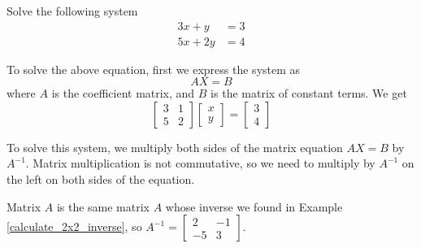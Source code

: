 \begin{example}
    Solve the following system
    \[
        \begin{aligned}
            3x + y  & = 3 \\
            5x + 2y & = 4
        \end{aligned}
    \]
\end{example}

\begin{solution}
    To solve the above equation, first we express the system as
    \[ AX = B \]
    where \( A \) is the coefficient matrix, and \( B \) is the matrix of constant terms. We get
    \[
        \left[
            \begin{array}{cc}
                3 & 1 \\
                5 & 2
            \end{array}
            \right]
        \left[
            \begin{array}{c}
                x \\
                y
            \end{array}
            \right]
        =
        \left[
            \begin{array}{c}
                3 \\
                4
            \end{array}
            \right]
    \]

    To solve this system, we multiply both sides of the matrix equation \( AX = B \) by \( A^{-1} \). Matrix multiplication is not commutative, so we need to multiply by \( A^{-1} \) on the left on both sides of the equation.

    Matrix \( A \) is the same matrix \( A \) whose inverse we found in Example \ref{calculate_2x2_inverse}, so \( A^{-1} = \left[
        \begin{array}{cc}
            2  & -1 \\
            -5 & 3
        \end{array}
        \right] \).


\end{solution}
